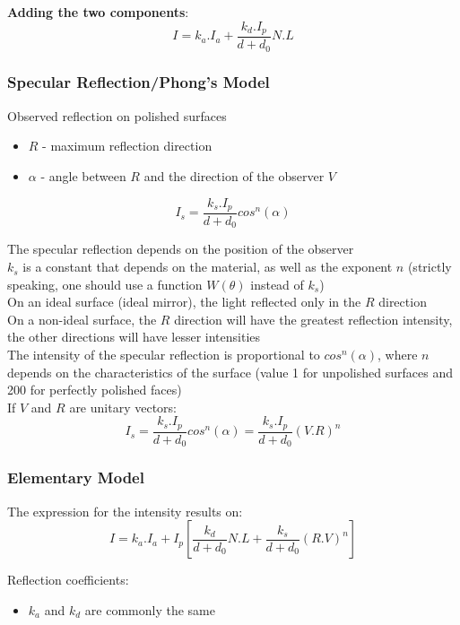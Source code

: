 \documentclass[a4paper]{article}
\begin{document}
\begin{flushleft}
\textbf{Adding the two components}:
\begin{equation}
	I = k_a.I_a + \frac{k_d.I_p}{d+d_0}N.L
\end{equation}

\subsubsection{Specular Reflection/Phong's Model}
Observed reflection on polished surfaces
\begin{itemize}
	\item $R$ - maximum reflection direction
	\item $\alpha$ - angle between $R$ and the direction of the observer $V$
\end{itemize}
\begin{equation}
	I_s = \frac{k_s.I_p}{d+d_0}cos^n(\alpha)
\end{equation}

The specular reflection depends on the position of the observer\\
$k_s$ is a constant that depends on the material, as well as the exponent $n$ (strictly speaking, one should use a function $W(\theta)$ instead of $k_s$)\\
On an ideal surface (ideal mirror), the light reflected only in the $R$ direction\\
On a non-ideal surface, the $R$ direction will have the greatest reflection intensity, the other directions will have lesser intensities\\
The intensity of the specular reflection is proportional to $cos^n(\alpha)$, where $n$ depends on the characteristics of the surface (value 1 for unpolished surfaces and 200 for perfectly polished faces)\\

If $V$ and $R$ are unitary vectors:
\begin{equation}
	I_s = \frac{k_s.I_p}{d+d_0}cos^n(\alpha) = \frac{k_s.I_p}{d+d_0}(V.R)^n
\end{equation}

\subsubsection{Elementary Model}
The expression for the intensity results on:
\begin{equation}
	I = k_a.I_a + I_p [\frac{k_d}{d+d_0}N.L + \frac{k_s}{d+d_0}(R.V)^n]
\end{equation}

Reflection coefficients:
\begin{itemize}
	\item $k_a$ and $k_d$ are commonly the same 
\end{itemize}


\end{flushleft}
\end{document}
